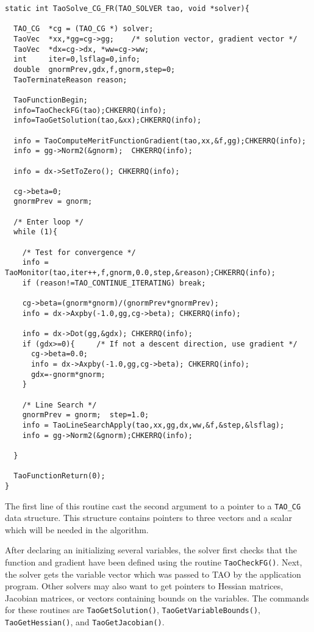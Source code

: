 \begin{verbatim}
static int TaoSolve_CG_FR(TAO_SOLVER tao, void *solver){

  TAO_CG  *cg = (TAO_CG *) solver;
  TaoVec  *xx,*gg=cg->gg;    /* solution vector, gradient vector */
  TaoVec  *dx=cg->dx, *ww=cg->ww;
  int     iter=0,lsflag=0,info;
  double  gnormPrev,gdx,f,gnorm,step=0;
  TaoTerminateReason reason;

  TaoFunctionBegin;
  info=TaoCheckFG(tao);CHKERRQ(info);
  info=TaoGetSolution(tao,&xx);CHKERRQ(info);

  info = TaoComputeMeritFunctionGradient(tao,xx,&f,gg);CHKERRQ(info);
  info = gg->Norm2(&gnorm);  CHKERRQ(info);

  info = dx->SetToZero(); CHKERRQ(info); 

  cg->beta=0;
  gnormPrev = gnorm;

  /* Enter loop */
  while (1){

    /* Test for convergence */
    info = TaoMonitor(tao,iter++,f,gnorm,0.0,step,&reason);CHKERRQ(info);
    if (reason!=TAO_CONTINUE_ITERATING) break;

    cg->beta=(gnorm*gnorm)/(gnormPrev*gnormPrev);
    info = dx->Axpby(-1.0,gg,cg->beta); CHKERRQ(info);
    
    info = dx->Dot(gg,&gdx); CHKERRQ(info);
    if (gdx>=0){     /* If not a descent direction, use gradient */
      cg->beta=0.0;
      info = dx->Axpby(-1.0,gg,cg->beta); CHKERRQ(info);
      gdx=-gnorm*gnorm;
    } 

    /* Line Search */
    gnormPrev = gnorm;  step=1.0;
    info = TaoLineSearchApply(tao,xx,gg,dx,ww,&f,&step,&lsflag);
    info = gg->Norm2(&gnorm);CHKERRQ(info);

  }
  
  TaoFunctionReturn(0);
}
\end{verbatim}

The first line of this routine cast the second argument to a pointer
to a {\tt TAO\_CG} data structure.  This structure contains pointers
to three vectors and a scalar which will be needed in the algorithm.

After declaring an initializing several variables, the solver first
checks that the function and gradient have been defined using the
routine {\tt TaoCheckFG()}.  Next, the solver gets the variable
vector which was passed to TAO by the application program.
Other solvers may also want to get pointers to Hessian matrices,
Jacobian matrices, or vectors containing bounds on the variables.
The commands for these routines are
{\tt TaoGetSolution()}, {\tt TaoGetVariableBounds()}, 
{\tt TaoGetHessian()}, and {\tt TaoGetJacobian()}.

